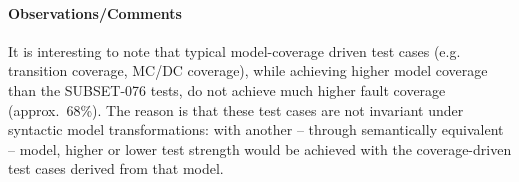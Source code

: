 






\paragraph{Observations/Comments}

It is interesting to note that typical model-coverage driven test
cases (e.g. transition coverage, MC/DC coverage), while achieving
higher model coverage than the SUBSET-076 tests, do not achieve much
higher fault coverage (approx.~68\%).  The reason is that these test
cases are not invariant under syntactic model transformations: with
another -- through semantically equivalent -- model, higher or lower
test strength would be achieved with the coverage-driven test cases
derived from that model.

